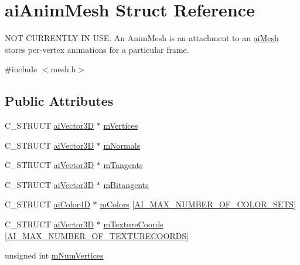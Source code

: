 \hypertarget{structaiAnimMesh}{\section{ai\-Anim\-Mesh \-Struct \-Reference}
\label{structaiAnimMesh}
}


\-N\-O\-T \-C\-U\-R\-R\-E\-N\-T\-L\-Y \-I\-N \-U\-S\-E. \-An \-Anim\-Mesh is an attachment to an \hyperlink{structaiMesh}{ai\-Mesh} stores per-\/vertex animations for a particular frame.  




{\ttfamily \#include $<$mesh.\-h$>$}

\subsection*{\-Public \-Attributes}
\begin{DoxyCompactItemize}
\item 
\-C\-\_\-\-S\-T\-R\-U\-C\-T \hyperlink{structaiVector3D}{ai\-Vector3\-D} $\ast$ \hyperlink{structaiAnimMesh_a0ac2dd4c1afd23e6a9293b1d0ded3060}{m\-Vertices}
\item 
\-C\-\_\-\-S\-T\-R\-U\-C\-T \hyperlink{structaiVector3D}{ai\-Vector3\-D} $\ast$ \hyperlink{structaiAnimMesh_a64a07a8c5c419b1e006c5302bca4d334}{m\-Normals}
\item 
\-C\-\_\-\-S\-T\-R\-U\-C\-T \hyperlink{structaiVector3D}{ai\-Vector3\-D} $\ast$ \hyperlink{structaiAnimMesh_a95dcc49c6d5ecc570ceb54552a0a9625}{m\-Tangents}
\item 
\-C\-\_\-\-S\-T\-R\-U\-C\-T \hyperlink{structaiVector3D}{ai\-Vector3\-D} $\ast$ \hyperlink{structaiAnimMesh_a7d60acf4d2b4b59dcc6c88956bfae85f}{m\-Bitangents}
\item 
\-C\-\_\-\-S\-T\-R\-U\-C\-T \hyperlink{structaiColor4D}{ai\-Color4\-D} $\ast$ \hyperlink{structaiAnimMesh_a4f062d9fac71c6b367fdf0f8638e1ca5}{m\-Colors} \mbox{[}\hyperlink{mesh_8h_a74ea1282873ac4b111b48d2380c26bdc}{\-A\-I\-\_\-\-M\-A\-X\-\_\-\-N\-U\-M\-B\-E\-R\-\_\-\-O\-F\-\_\-\-C\-O\-L\-O\-R\-\_\-\-S\-E\-T\-S}\mbox{]}
\item 
\-C\-\_\-\-S\-T\-R\-U\-C\-T \hyperlink{structaiVector3D}{ai\-Vector3\-D} $\ast$ \hyperlink{structaiAnimMesh_ad24a0451adeb845a53eb2351b9462e0a}{m\-Texture\-Coords} \mbox{[}\hyperlink{mesh_8h_a335874c5058c7f1e866eb953bf192258}{\-A\-I\-\_\-\-M\-A\-X\-\_\-\-N\-U\-M\-B\-E\-R\-\_\-\-O\-F\-\_\-\-T\-E\-X\-T\-U\-R\-E\-C\-O\-O\-R\-D\-S}\mbox{]}
\item 
unsigned int \hyperlink{structaiAnimMesh_a6bb0d45317a1bbea7f2b7f8191d0c436}{m\-Num\-Vertices}
\end{DoxyCompactItemize}


